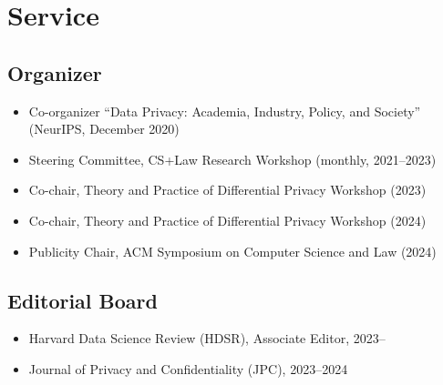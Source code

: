 

\newcommand{\cvservice}[1]{\item {#1}}
\newcommand{\cvreviewer}[1]{\item {#1}}

\section{Service}

\subsection{Organizer}
\begin{itemize}[label={}, nosep]
    \cvreviewer{Co-organizer “Data Privacy: Academia, Industry, Policy, and Society” \\(NeurIPS, December
    2020)}
    \cvreviewer{Steering Committee, CS+Law
     Research Workshop (monthly, 2021--2023)}
    \cvreviewer{Co-chair, Theory and Practice of Differential Privacy Workshop (2023)}
    \cvreviewer{Co-chair, Theory and Practice of Differential Privacy Workshop (2024)}
    \cvreviewer{Publicity Chair, ACM Symposium on Computer Science and Law (2024)}
  \end{itemize}


\subsection{Editorial Board}
\begin{itemize}[label={}, nosep]
\cvreviewer{Harvard Data Science Review (HDSR), Associate Editor, 2023--}
 \cvreviewer{Journal of Privacy and Confidentiality (JPC), 2023--2024}
\end{itemize}


